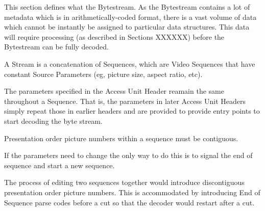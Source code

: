 This section defines what the Bytestream. As the Bytestream contains a
lot of metadata which is in arithmetically-coded format, there is a vast
volume of data which cannot be instantly be assigned to particular data
structures. This data will require processing (as described in Sections
XXXXXX) before the Bytestream can be fully decoded.

A Stream is a concatenation of Sequences, which are Video Sequences
that have constant Source Parameters (eg, picture size, aspect ratio,
etc).

The parameters specified in the Access Unit Header reamain the same
throughout a Sequence.  That is, the parameters in later Access Unit
Headers simply repeat those in earlier headers and are provided to
provide entry points to start decoding the byte stream.

Presentation order picture numbers within a sequence must be contiguous.

If the parameters need to change the only way to do this is to signal
the end of sequence and start a new sequence.

The process of editing two sequences together would introduce
discontiguous presentation order picture numbers.  This is accommodated
by introducing End of Sequence parse codes before a cut so that the
decoder would restart after a cut.

